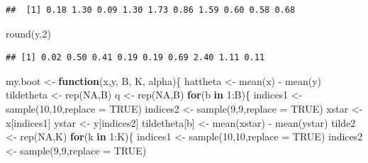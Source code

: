 \documentclass[
]{book}
\newenvironment{Shaded}{\begin{snugshade}}{\end{snugshade}}
\newcommand{\AttributeTok}[1]{\textcolor[rgb]{0.77,0.63,0.00}{#1}}
\newcommand{\ConstantTok}[1]{\textcolor[rgb]{0.00,0.00,0.00}{#1}}
\newcommand{\ControlFlowTok}[1]{\textcolor[rgb]{0.13,0.29,0.53}{\textbf{#1}}}
\newcommand{\DecValTok}[1]{\textcolor[rgb]{0.00,0.00,0.81}{#1}}
\newcommand{\FunctionTok}[1]{\textcolor[rgb]{0.00,0.00,0.00}{#1}}
\newcommand{\NormalTok}[1]{#1}
\newcommand{\OtherTok}[1]{\textcolor[rgb]{0.56,0.35,0.01}{#1}}
\newcommand{\SpecialCharTok}[1]{\textcolor[rgb]{0.00,0.00,0.00}{#1}}
\begin{document}
\begin{verbatim}
##  [1] 0.18 1.30 0.09 1.30 1.73 0.86 1.59 0.60 0.58 0.68
\end{verbatim}

\begin{Shaded}
\begin{Highlighting}[]
\FunctionTok{round}\NormalTok{(y,}\DecValTok{2}\NormalTok{)}
\end{Highlighting}
\end{Shaded}

\begin{verbatim}
## [1] 0.02 0.50 0.41 0.19 0.19 0.69 2.40 1.11 0.11
\end{verbatim}

\begin{Shaded}
\begin{Highlighting}[]
\NormalTok{my.boot }\OtherTok{\textless{}{-}} \ControlFlowTok{function}\NormalTok{(x,y, B, K, alpha)\{}
\NormalTok{  hattheta }\OtherTok{\textless{}{-}} \FunctionTok{mean}\NormalTok{(x) }\SpecialCharTok{{-}} \FunctionTok{mean}\NormalTok{(y)}
\NormalTok{  tildetheta }\OtherTok{\textless{}{-}} \FunctionTok{rep}\NormalTok{(}\ConstantTok{NA}\NormalTok{,B)}
\NormalTok{  q }\OtherTok{\textless{}{-}} \FunctionTok{rep}\NormalTok{(}\ConstantTok{NA}\NormalTok{,B)}
  \ControlFlowTok{for}\NormalTok{(b }\ControlFlowTok{in} \DecValTok{1}\SpecialCharTok{:}\NormalTok{B)\{}
\NormalTok{  indices1 }\OtherTok{\textless{}{-}} \FunctionTok{sample}\NormalTok{(}\DecValTok{10}\NormalTok{,}\DecValTok{10}\NormalTok{,}\AttributeTok{replace =} \ConstantTok{TRUE}\NormalTok{)  }
\NormalTok{  indices2 }\OtherTok{\textless{}{-}} \FunctionTok{sample}\NormalTok{(}\DecValTok{9}\NormalTok{,}\DecValTok{9}\NormalTok{,}\AttributeTok{replace =} \ConstantTok{TRUE}\NormalTok{)  }
\NormalTok{  xstar }\OtherTok{\textless{}{-}}\NormalTok{ x[indices1]}
\NormalTok{  ystar }\OtherTok{\textless{}{-}}\NormalTok{ y[indices2]}
\NormalTok{  tildetheta[b] }\OtherTok{\textless{}{-}} \FunctionTok{mean}\NormalTok{(xstar) }\SpecialCharTok{{-}} \FunctionTok{mean}\NormalTok{(ystar)}
\NormalTok{  tilde2 }\OtherTok{\textless{}{-}} \FunctionTok{rep}\NormalTok{(}\ConstantTok{NA}\NormalTok{,K)}
    \ControlFlowTok{for}\NormalTok{(k }\ControlFlowTok{in} \DecValTok{1}\SpecialCharTok{:}\NormalTok{K)\{}
\NormalTok{        indices1 }\OtherTok{\textless{}{-}} \FunctionTok{sample}\NormalTok{(}\DecValTok{10}\NormalTok{,}\DecValTok{10}\NormalTok{,}\AttributeTok{replace =} \ConstantTok{TRUE}\NormalTok{)  }
\NormalTok{        indices2 }\OtherTok{\textless{}{-}} \FunctionTok{sample}\NormalTok{(}\DecValTok{9}\NormalTok{,}\DecValTok{9}\NormalTok{,}\AttributeTok{replace =} \ConstantTok{TRUE}\NormalTok{) }

\end{Highlighting}
\end{Shaded}
\end{document}
